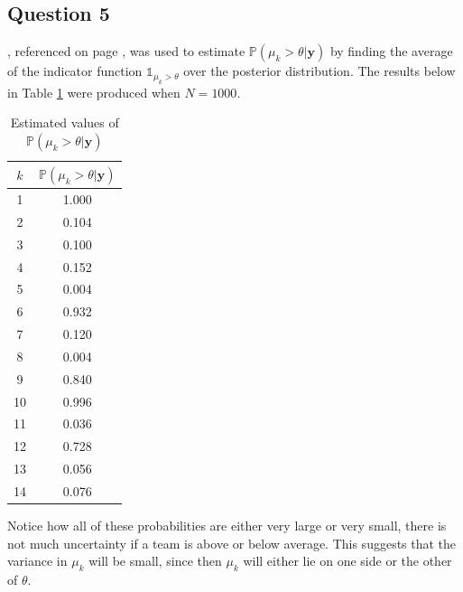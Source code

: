 \documentclass[10pt,a4paper,notitlepage]{article}
\newcommand{\p}{\mathbb{P}}
\newcommand{\y}{\mathbf{y}}
\begin{document}
\subsection*{\centering Question 5}
, referenced on page \pageref{cd:4}, was used to estimate $\p(\mu_{k}>\theta|\y)$ by finding the average of the indicator function $\mathds{1}_{\mu_{k}>\theta}$ over the posterior distribution. The results below in Table \ref{tb:2} were produced when $N=1000$.
\begin{table}[H]
\centering
\begin{tabular}{c|c} $k$&$\p(\mu_{k}>\theta|\y)$\\\hline 
1 & 1.000\\
2 & 0.104\\
3 & 0.100\\
4 & 0.152\\
5 & 0.004\\
6 & 0.932\\
7 & 0.120\\
8 & 0.004\\
9 & 0.840\\
10 & 0.996\\
11 & 0.036\\
12 & 0.728\\
13 & 0.056\\
14 & 0.076 \\
\end{tabular}
\caption{Estimated values of $\p(\mu_{k}>\theta|\y)$}\label{tb:2}
\end{table}
Notice how all of these probabilities are either very large or very small, there is not much uncertainty if a team is above or below average. This suggests that the variance in $\mu_{k}$ will be small, since then $\mu_{k}$ will either lie on one side or the other of $\theta$.
\end{document}
